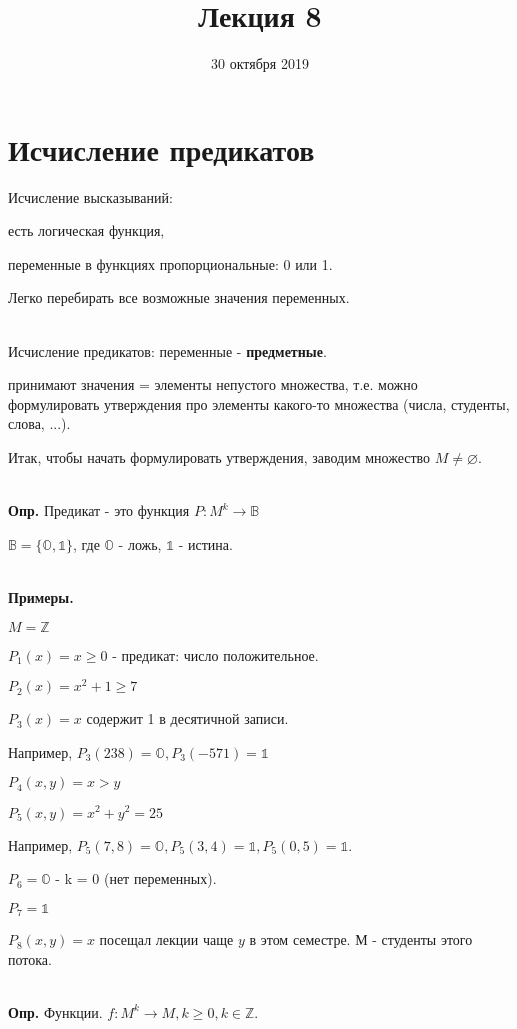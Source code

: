 \documentclass{article}
\title{Лекция 8}
\date{30 октября 2019}
\begin{document}
\maketitle

\section{Исчисление предикатов}

Исчисление высказываний:

есть логическая функция,

переменные в функциях пропорциональные: 0 или 1.

\noindent Легко перебирать все возможные значения переменных.

~\\
Исчисление предикатов: переменные - \textbf{предметные}.

принимают значения = элементы непустого множества, т.е. можно формулировать утверждения про элементы какого-то множества (числа, студенты, слова, ...).

Итак, чтобы начать формулировать утверждения, заводим множество $M\neq \varnothing.$

~\\
\textbf{Опр. }Предикат - это функция $P: M^k \rightarrow \mathds{B}$

$\mathds{B} = \{\mathds{O}, \mathds{1}\}$, где $\mathds{O}$ - ложь, $\mathds{1}$ - истина.

~\\
\textbf{Примеры. }

$M = \mathds{Z}$

$P_1(x) = x\geqslant 0$ - предикат: число положительное.

$P_2(x) =  x^2+1\geqslant 7$

$P_3(x) = x$ содержит 1 в десятичной записи. 

Например, $P_3(238) = \mathds{O}, P_3(-571) = \mathds{1}$

$P_4(x,y) = x>y$

$P_5(x,y) = x^2+y^2 = 25$

Например, $P_5(7,8)=\mathds{O}, P_5(3,4)=\mathds{1}, P_5(0,5)=\mathds{1}.$

$P_6 = \mathds{O}$ - k = 0 (нет переменных).

$P_7 = \mathds{1}$

$P_8(x,y) = x$ посещал лекции чаще $y$ в этом семестре.
М - студенты этого потока.

~\\
\textbf{Опр.} Функции. $f: M^k \rightarrow M, k\geqslant 0, k \in \mathds{Z}.$
\end{document}
